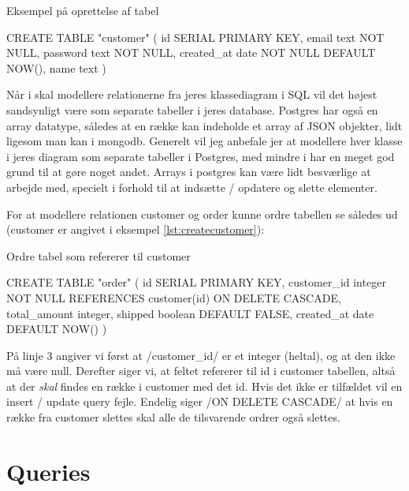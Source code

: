\documentclass[english,course]{lecture}
\begin{document}
\begin{listing}[H]
\caption{Eksempel på oprettelse af tabel}
\label{lst:createcustomer}
\begin{sqlcode}
CREATE TABLE "customer" (
	id SERIAL PRIMARY KEY,
	email text NOT NULL, 
	password text NOT NULL, 
	created_at date NOT NULL DEFAULT NOW(),
	name text
)
\end{sqlcode}
\end{listing}

Når i skal modellere relationerne fra jeres klassediagram i SQL vil det højest sandsynligt være som separate tabeller i jeres database. Postgres har også en array datatype, således at en række kan indeholde et array af JSON objekter, lidt ligesom man kan i mongodb. Generelt vil jeg anbefale jer at modellere hver klasse i jeres diagram som separate tabeller i Postgres, med mindre i har en meget god grund til at gøre noget andet. Arrays i postgres kan være lidt besværlige at arbejde med, specielt i forhold til at indsætte / opdatere og slette elementer.

For at modellere relationen customer og order kunne ordre tabellen se således ud (customer er angivet i eksempel \ref{lst:createcustomer}):

\begin{listing}[H]
\caption{Ordre tabel som refererer til customer}
\label{lst:createorder}
\begin{sqlcode}
CREATE TABLE "order" (
	id SERIAL PRIMARY KEY,
	customer_id integer NOT NULL REFERENCES customer(id) ON DELETE CASCADE,
	total_amount integer,
	shipped boolean DEFAULT FALSE,
	created_at date DEFAULT NOW()
)
\end{sqlcode}
\end{listing}



På linje 3 angiver vi først at \sqlinline/customer_id/ er et integer (heltal), og at den ikke må være null. Derefter siger vi, at feltet refererer til id i customer tabellen, altså at der \textit{skal} findes en række i customer med det id. Hvis det ikke er tilfældet vil en insert / update query fejle. Endelig siger \sqlinline/ON DELETE CASCADE/ at hvis en række fra customer slettes skal alle de tilsvarende ordrer også slettes.

\section{Queries}
\end{document}
